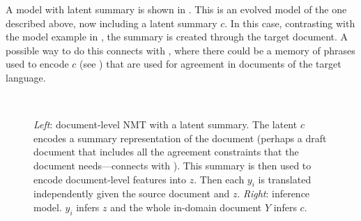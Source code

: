 A model with latent summary is shown in
. This is an evolved model of the
one described above, now including a latent summary $c$. In this
case, contrasting with the model example in
, the summary is created through the
target document. A possible way to do this connects with
, where there could be a memory of phrases
used to encode $c$ (see ) that are used for
agreement in documents of the target language.

\begin{figure}[t]
    \centering
    ~

    \caption{{\it Left}: document-level NMT with a latent summary.
    The latent $c$ encodes a summary representation of the document
    (perhaps a draft document that includes all the agreement
    constraints that the document needs---connects with
    ). This summary is then used to encode
    document-level features into $z$. Then each $y_i$ is translated
    independently given the source document and $z$. {\it Right}:
    inference model. $y_i$ infers $z$ and the whole in-domain
    document $Y$ infers $c$.}
    \label{fig:doclevelstatistician}

\end{figure}

\cleardoublepage
